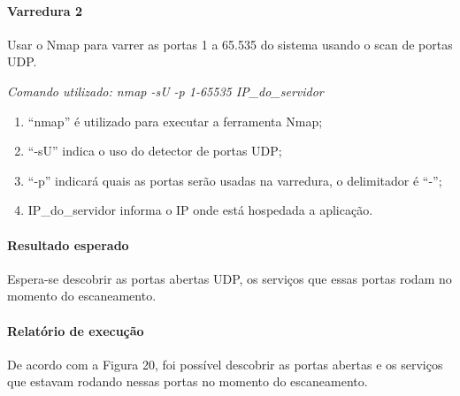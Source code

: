 \documentclass[
    12pt,               %
    openright,          %
    oneside,            %
    a4paper,            %
    section=TITLE,     %
    english,            %
    french,             %
    spanish,            %
    brazil              %
    ]{abntex2}
\begin{document}


\paragraph*{Varredura 2}

Usar o Nmap para varrer as portas 1 a 65.535 do sistema usando o scan de portas UDP.


\emph{Comando utilizado: nmap -sU -p 1-65535 IP\_do\_servidor}



\begin{enumerate}[start=1]
	
\item \textquotedblleft{}nmap\textquotedblright{} é utilizado para executar a ferramenta Nmap;
	
\item \textquotedblleft{}-sU\textquotedblright{} indica o uso do detector de portas UDP;
	
\item \textquotedblleft{}-p\textquotedblright{} indicará quais as portas serão usadas na varredura, o delimitador é \textquotedblleft{}-\textquotedblright{};
	
\item IP\_do\_servidor informa o IP onde está hospedada a aplicação.

\end{enumerate}


\paragraph*{Resultado esperado}

Espera-se descobrir as portas abertas UDP, os serviços que essas portas rodam no momento do escaneamento.



\paragraph*{Relatório de execução}

De acordo com a Figura 20, foi possível descobrir as portas abertas e os serviços que estavam rodando nessas portas no momento do escaneamento.
\end{document}

